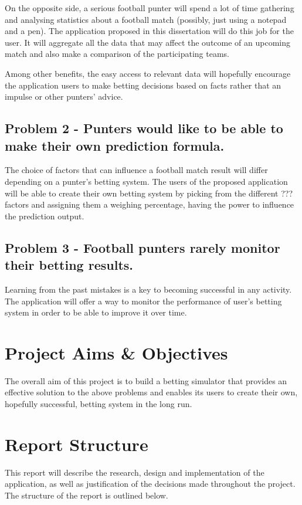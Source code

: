 On the opposite side, a serious football punter will spend a lot of time gathering and analysing statistics about a football match (possibly, just using a notepad and a pen). The application proposed in this dissertation will do this job for the user. It will aggregate all the data that may affect the outcome of an upcoming match and also make a comparison of the participating teams.

Among other benefits, the easy access to relevant data will hopefully encourage the application users to make betting decisions based on facts rather that an impulse or other punters’ advice.

\subsection*{Problem 2 - Punters would like to be able to make their own prediction formula.}
The choice of factors that can influence a football match result will differ depending on a punter's betting system. The users of the proposed application will be able to create their own betting system by picking from the different ??? factors and assigning them a weighing percentage, having the power to influence the prediction output.

\subsection*{Problem 3 - Football punters rarely monitor their betting results.}
Learning from the past mistakes is a key to becoming successful in any activity. The application will offer a way to monitor the performance of user's betting system in order to be able to improve it over time. 

\section{Project Aims \& Objectives}
\label{sec:objectives_intro}
The overall aim of this project is to build a betting simulator that provides an effective solution to the above problems and enables its users to create their own, hopefully successful, betting system in the long run. 

\section{Report Structure}
\label{sec:reportstructure_intro}
This report will describe the research, design and implementation of the application, as well as justification of the decisions made throughout the project.
The structure of the report is outlined below. 

